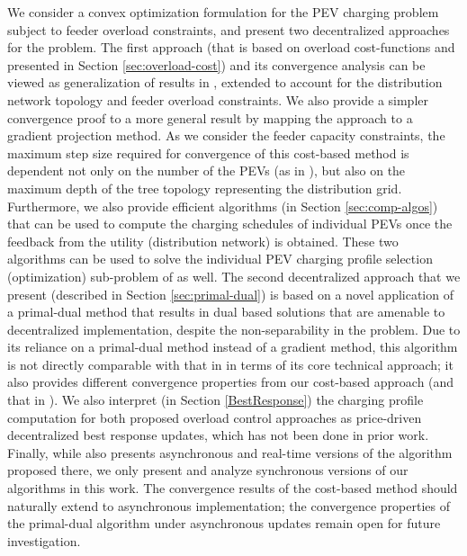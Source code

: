 \documentclass[12pt,draftcls,onecolumn]{IEEEtran}
\begin{document}
We consider a convex optimization formulation for the PEV charging problem subject to feeder overload constraints, and present two decentralized approaches for the problem. The first approach (that is based on overload cost-functions and presented in Section \ref{sec:overload-cost}) and its convergence analysis can be viewed as generalization of results in \cite{GTL13}, extended to account for the distribution network topology and feeder overload constraints. We also provide a simpler convergence proof to a more general result by mapping the approach to a gradient projection method. As we consider the feeder capacity constraints, the maximum step size required for convergence of this cost-based method is dependent not only on the number of the PEVs (as in \cite{GTL13}), but also on the maximum depth of the tree topology representing the distribution grid. Furthermore, we also provide efficient algorithms (in Section \ref{sec:comp-algos}) that can be used to compute the charging schedules of individual PEVs once the feedback from the utility (distribution network) is obtained. These two algorithms can be used to solve the individual PEV charging profile selection (optimization) sub-problem of \cite{GTL13} as well. The second decentralized approach that we present (described in Section \ref{sec:primal-dual}) is based on a novel application of a primal-dual method that results in dual based solutions that are amenable to decentralized implementation, despite the non-separability in the problem. Due to its reliance on a primal-dual method instead of a gradient method, this algorithm is not directly comparable with that in \cite{GTL13} in terms of its core technical approach; it also provides different convergence properties from our cost-based approach (and that in \cite{GTL13}). We also interpret (in Section \ref{BestResponse}) the charging profile computation for both proposed overload control approaches as price-driven decentralized best response updates, which has not been done in prior work. Finally, while \cite{GTL13} also presents asynchronous and real-time versions of the algorithm proposed there, we only present and analyze synchronous versions of our algorithms in this work. The convergence results of the cost-based method should naturally extend to asynchronous implementation; the convergence properties of the primal-dual algorithm under asynchronous updates remain open for future investigation.
\end{document}
